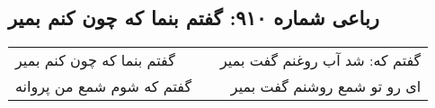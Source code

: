 \begin{center}
\section*{رباعی شماره ۹۱۰: گفتم بنما که چون کنم بمیر}
\label{sec:0910}
\begin{longtable}{l p{0.5cm} r}
گفتم بنما که چون کنم بمیر
&&
گفتم که: شد آب روغنم گفت بمیر
\\
گفتم که شوم شمع من پروانه
&&
ای رو تو شمع روشنم گفت بمیر
\\
\end{longtable}
\end{center}
